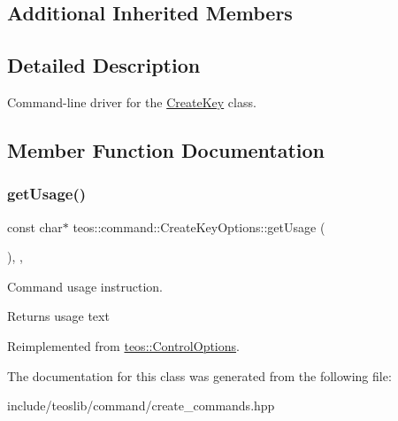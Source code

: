 \subsection*{Additional Inherited Members}


\subsection{Detailed Description}
Command-\/line driver for the \mbox{\hyperlink{classteos_1_1command_1_1_create_key}{Create\+Key}} class. 

\subsection{Member Function Documentation}
\mbox{\label{classteos_1_1command_1_1_create_key_options_ac4c7176d534ed832ebfc954e36238a4c}} 
\subsubsection{\texorpdfstring{get\+Usage()}{getUsage()}}
{\footnotesize\ttfamily const char$\ast$ teos\+::command\+::\+Create\+Key\+Options\+::get\+Usage (\begin{DoxyParamCaption}{ }\end{DoxyParamCaption})\hspace{0.3cm}{\ttfamily [inline]}, {\ttfamily [protected]}, {\ttfamily [virtual]}}



Command \textquotesingle{}usage\textquotesingle{} instruction. 

\begin{DoxyReturn}{Returns}
usage text 
\end{DoxyReturn}


Reimplemented from \mbox{\hyperlink{classteos_1_1_control_options_a0aa5671f9bc750ed5280c26c543874f3}{teos\+::\+Control\+Options}}.



The documentation for this class was generated from the following file\+:\begin{DoxyCompactItemize}
\item 
include/teoslib/command/create\+\_\+commands.\+hpp\end{DoxyCompactItemize}
